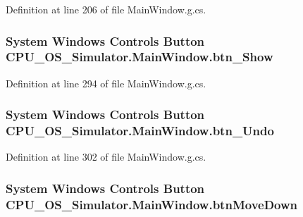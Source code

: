Definition at line 206 of file Main\+Window.\+g.\+cs.

\hypertarget{class_c_p_u___o_s___simulator_1_1_main_window_a3c6c4760a8fd64f653fff0ad06374f13}{}
\subsubsection[{btn\+\_\+\+Show}]{\setlength{\rightskip}{0pt plus 5cm}System Windows Controls Button C\+P\+U\+\_\+\+O\+S\+\_\+\+Simulator.\+Main\+Window.\+btn\+\_\+\+Show\hspace{0.3cm}{\ttfamily [package]}}\label{class_c_p_u___o_s___simulator_1_1_main_window_a3c6c4760a8fd64f653fff0ad06374f13}


Definition at line 294 of file Main\+Window.\+g.\+cs.

\hypertarget{class_c_p_u___o_s___simulator_1_1_main_window_ac30720a1b345a3d59312d2d68f742359}{}
\subsubsection[{btn\+\_\+\+Undo}]{\setlength{\rightskip}{0pt plus 5cm}System Windows Controls Button C\+P\+U\+\_\+\+O\+S\+\_\+\+Simulator.\+Main\+Window.\+btn\+\_\+\+Undo\hspace{0.3cm}{\ttfamily [package]}}\label{class_c_p_u___o_s___simulator_1_1_main_window_ac30720a1b345a3d59312d2d68f742359}


Definition at line 302 of file Main\+Window.\+g.\+cs.

\hypertarget{class_c_p_u___o_s___simulator_1_1_main_window_ac6bfabebf21c92a905764305b789df46}{}
\subsubsection[{btn\+Move\+Down}]{\setlength{\rightskip}{0pt plus 5cm}System Windows Controls Button C\+P\+U\+\_\+\+O\+S\+\_\+\+Simulator.\+Main\+Window.\+btn\+Move\+Down\hspace{0.3cm}{\ttfamily [package]}}\label{class_c_p_u___o_s___simulator_1_1_main_window_ac6bfabebf21c92a905764305b789df46}


